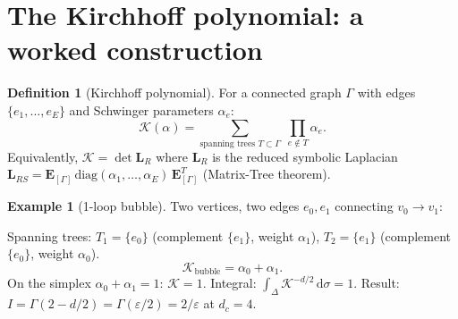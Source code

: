 \documentclass[11pt,a4paper]{article}
\theoremstyle{definition}
\newtheorem{definition}[theorem]{Definition}
\newtheorem{example}[theorem]{Example}
\newcommand{\dd}{\mathrm{d}}
\newcommand{\K}{\mathcal{K}}
\begin{document}
\section{The Kirchhoff polynomial: a worked construction}
\label{sec:kirchhoff}

\begin{definition}[Kirchhoff polynomial]
For a connected graph $\Gamma$ with edges $\{e_1, \ldots, e_E\}$
and Schwinger parameters $\alpha_e$:
\begin{equation}
\K(\alpha) = \sum_{\text{spanning trees } T \subset \Gamma}
\;\prod_{e \notin T} \alpha_e.
\label{eq:kirchhoff_def}
\end{equation}
Equivalently, $\K = \det \mathbf{L}_R$ where $\mathbf{L}_R$ is the
reduced symbolic Laplacian
$\mathbf{L}_{RS} = \mathbf{E}_{[\Gamma]}\,
\text{diag}(\alpha_1,\ldots,\alpha_E)\,\mathbf{E}_{[\Gamma]}^T$
(Matrix-Tree theorem).
\end{definition}

\begin{example}[1-loop bubble]
\label{ex:bubble}
Two vertices, two edges $e_0, e_1$ connecting $v_0 \to v_1$:

\begin{center}
\end{center}

Spanning trees: $T_1 = \{e_0\}$ (complement $\{e_1\}$, weight $\alpha_1$),
$T_2 = \{e_1\}$ (complement $\{e_0\}$, weight $\alpha_0$).
\begin{equation}
\K_{\text{bubble}} = \alpha_0 + \alpha_1.
\end{equation}
On the simplex $\alpha_0 + \alpha_1 = 1$: $\K = 1$.
Integral: $\int_\Delta \K^{-d/2}\,\dd\sigma = 1$. Result:
$I = \Gamma(2 - d/2) = \Gamma(\varepsilon/2) = 2/\varepsilon$ at $d_c = 4$.
\end{example}
\end{document}
